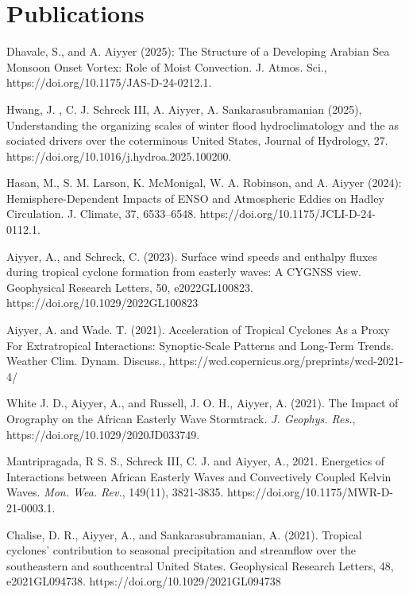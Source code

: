 \section*{Publications}

\begin{ilist}

\item Dhavale, S., and A. Aiyyer (2025): The Structure of a Developing Arabian Sea Monsoon Onset Vortex: Role of Moist Convection. J. Atmos. Sci., https://doi.org/10.1175/JAS-D-24-0212.1. 

\item Hwang, J. , C. J. Schreck III, A. Aiyyer, A. Sankarasubramanian (2025), Understanding the organizing scales of winter flood hydroclimatology and the as sociated drivers over the coterminous United States, Journal of Hydrology, 27. https://doi.org/10.1016/j.hydroa.2025.100200.

\item Hasan, M., S. M. Larson, K. McMonigal, W. A. Robinson, and A. Aiyyer (2024): Hemisphere-Dependent Impacts of ENSO and Atmospheric Eddies on Hadley Circulation. J. Climate, 37, 6533–6548.  https://doi.org/10.1175/JCLI-D-24-0112.1. 
  
\item  Aiyyer, A., and Schreck, C. (2023). Surface wind speeds and enthalpy fluxes during tropical cyclone formation from easterly waves: A CYGNSS view. Geophysical Research Letters, 50, e2022GL100823. https://doi.org/10.1029/2022GL100823
  
\item Aiyyer, A. and Wade. T. (2021). Acceleration of Tropical Cyclones As a Proxy For Extratropical
Interactions: Synoptic-Scale Patterns and Long-Term Trends. Weather Clim. Dynam. Discuss., https://wcd.copernicus.org/preprints/wcd-2021-4/

\item White J. D., Aiyyer, A., and Russell, J. O. H., Aiyyer, A. (2021). The Impact of Orography on the African Easterly Wave Stormtrack.  \emph{J. Geophys. Res.}, https://doi.org/10.1029/2020JD033749.
  

\item Mantripragada, R S. S., Schreck III, C. J. and Aiyyer, A., 2021. Energetics of Interactions between African Easterly Waves and Convectively Coupled Kelvin Waves.  \emph{Mon. Wea. Rev.}, 149(11), 3821-3835.  https://doi.org/10.1175/MWR-D-21-0003.1.

\item Chalise, D. R., Aiyyer, A., and Sankarasubramanian, A. (2021). Tropical cyclones’ contribution to seasonal precipitation and streamflow over the southeastern and southcentral United States. Geophysical Research Letters, 48, e2021GL094738. https://doi.org/10.1029/2021GL094738
  

\end{ilist}
